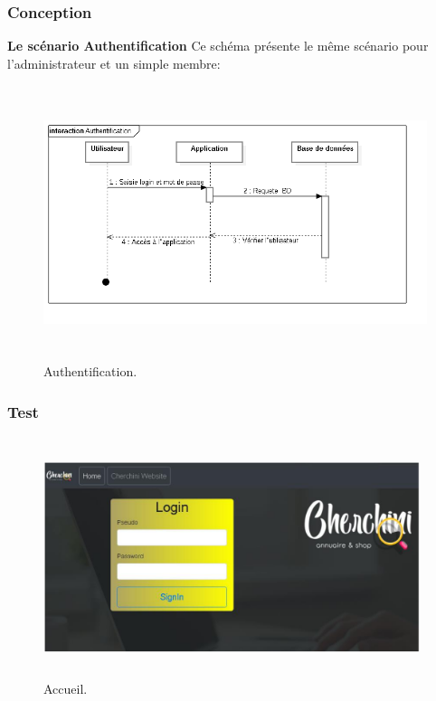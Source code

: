 
\subsubsection{Conception}
\textbf{Le sc\'{e}nario \guillemotleft{} Authentification \guillemotright{}}
Ce sch\'{e}ma pr\'{e}sente le m\^{e}me sc\'{e}nario pour l'administrateur et un simple
membre:


\begin{figure}[H]
\center
\includegraphics[width=14cm,height=8cm]{./figures/seq/A.png}
\caption{Authentification.}
\end{figure}


\subsubsection{Test} 

\FloatBarrier
\begin{figure}[H]
\center
\includegraphics[width=11cm,height=7cm]{./figures/pres/1.png}
\caption{Accueil.}

\end{figure}
\FloatBarrier